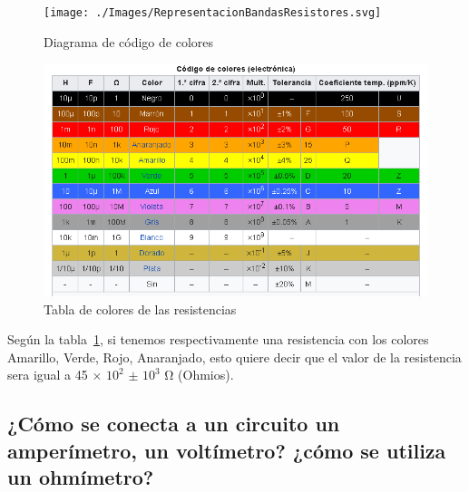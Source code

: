 \documentclass[letterpaper, 12pt]{report}
\begin{document}
\begin{figure}[H]
	\centering

	\texttt{[image: ./Images/RepresentacionBandasResistores.svg]}
	\caption{Diagrama de código de colores}
\end{figure}

\begin{figure}[H]
	\centering

	\includegraphics[scale = .65]{./Images/TablaDeColoresResistencias}
	\caption{Tabla de colores de las resistencias}
	\label{Tabla de colores de las resistencias}
\end{figure}

Según la tabla~\ref{Tabla de colores de las resistencias}, si tenemos
respectivamente una resistencia con los colores Amarillo, Verde, Rojo,
Anaranjado, esto quiere decir que el valor de la resistencia sera igual a
45 $\times{}$ $10^2$ $\pm$ $10^3$ Ω (Ohmios).

\subsection{¿Cómo se conecta a un circuito un amperímetro,
	un voltímetro? ¿cómo se utiliza un ohmímetro?}
\end{document}
